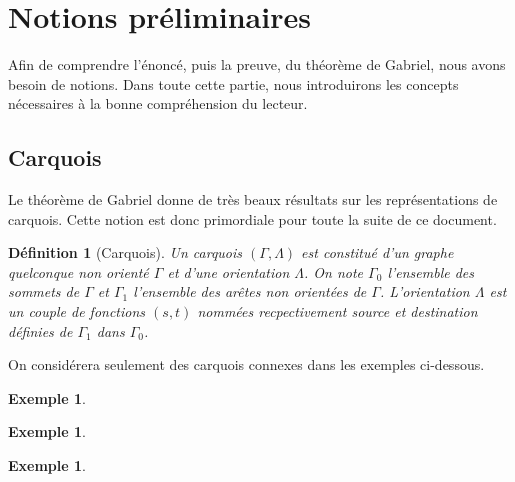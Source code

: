 \documentclass[a4paper,11pt]{article}
\newtheorem{defi}[thm]{Définition}%
\newtheorem{ex}[thm]{Exemple}%
\begin{document}
\section{Notions préliminaires}
Afin de comprendre l'énoncé, puis la preuve, du théorème de Gabriel, nous avons besoin de notions. Dans toute cette partie, nous introduirons les concepts nécessaires à la bonne compréhension du lecteur.

\subsection{Carquois}
Le théorème de Gabriel donne de très beaux résultats sur les représentations de carquois. Cette notion est donc primordiale pour toute la suite de ce document.
\begin{defi}[Carquois]
	\label{carquois}
	Un \emph{carquois} $(\Gamma,\Lambda)$ est constitué d'un graphe quelconque non orienté $\Gamma$ et d'une orientation $\Lambda$. On note  $\Gamma_0$ l'ensemble des sommets de $\Gamma$ et $\Gamma_1$ l'ensemble des arêtes non orientées de $\Gamma$. L'orientation $\Lambda$ est un couple de fonctions $(s,t)$ nommées recpectivement source et destination définies de $\Gamma_1$ dans $\Gamma_0$. 
\end{defi}
On considérera seulement des carquois connexes dans les exemples ci-dessous.
	\begin{ex}
		\label{carquois_simple}
	\end{ex}
	\begin{ex}
		\label{carquois_boucle}
	\end{ex}
	\begin{ex}
	\end{ex}
\end{document}

